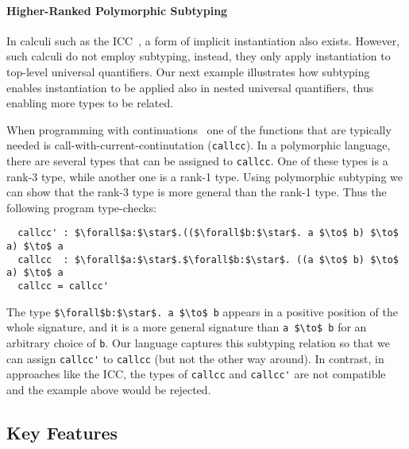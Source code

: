 \paragraph{Higher-Ranked Polymorphic Subtyping}
\label{sec:higher-ranked-poly}

In calculi such as the ICC~\citep{miquel2001implicit}, a form of implicit instantiation also exists.
However, such calculi do not employ subtyping, instead, they only apply instantiation
to top-level universal quantifiers. Our next example illustrates how subtyping enables
instantiation to be applied also in nested universal quantifiers, thus enabling
more types to be related.

When programming with continuations~\citep{sussman1998scheme} one of the
functions that are typically needed is call-with-current-continutation
(\verb|callcc|). In a polymorphic language, there are several types that can be
assigned to \verb|callcc|. One of these types is a rank-3 type,
while another one is a rank-1 type.
Using polymorphic subtyping we can show that the rank-3
type is more general than the rank-1 type. Thus the following program type-checks:
\begin{lstlisting}
  callcc' : $\forall$a:$\star$.(($\forall$b:$\star$. a $\to$ b) $\to$ a) $\to$ a
  callcc  : $\forall$a:$\star$.$\forall$b:$\star$. ((a $\to$ b) $\to$ a) $\to$ a
  callcc = callcc'
\end{lstlisting}
\noindent The type \lstinline{$\forall$b:$\star$. a $\to$ b} appears in a positive position
of the whole signature, and it is a more general signature than \lstinline{a $\to$ b}
for an arbitrary choice of \lstinline{b}. Our language captures this subtyping relation so that
we can assign \lstinline{callcc'} to \lstinline{callcc} (but not the other way around).
In contrast, in approaches like the ICC, the types of \lstinline{callcc} and \lstinline{callcc'}
are not compatible and the example above would be rejected.

\subsection{Key Features}
\label{sec:feature-overview}

